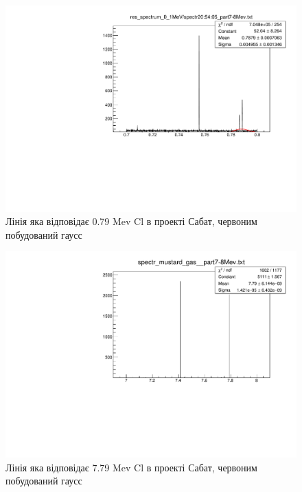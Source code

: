 \documentclass[a4paper, 14pt]{article}
\numberwithin{equation}{section}
\numberwithin{table}{section}
\numberwithin{equation}{section}
\numberwithin{table}{section}
\begin{document}
		\begin{figure}[hbt!]
			\centering \includegraphics[width=1\textwidth]{Cl_0_79.pdf}
			\caption{Лінія яка відповідає 0.79 Mev Cl в проекті Сабат, червоним побудований гаусс}
			\label{ris:image5}
		\end{figure}
	
		\begin{figure}[hbt!]
			\centering \includegraphics[width=1\textwidth]{Cl7_79MeV.pdf}
			\caption{Лінія яка відповідає 7.79 Mev Cl в проекті Сабат, червоним побудований гаусс}
			\label{ris:image6}
		\end{figure}
	
\end{document}

